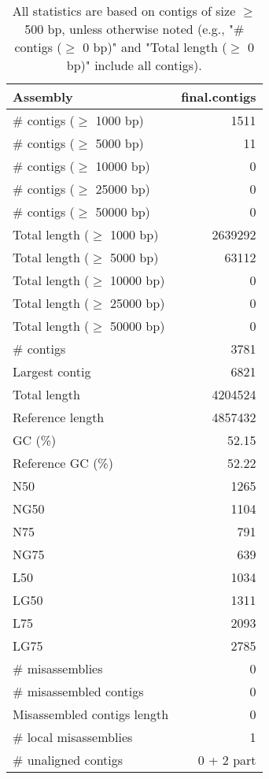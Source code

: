 \documentclass[12pt,a4paper]{article}
\begin{document}
\begin{table}[ht]
\begin{center}
\caption{All statistics are based on contigs of size $\geq$ 500 bp, unless otherwise noted (e.g., "\# contigs ($\geq$ 0 bp)" and "Total length ($\geq$ 0 bp)" include all contigs).}
\begin{tabular}{|l*{1}{|r}|}
\hline
Assembly & final.contigs \\ \hline
\# contigs ($\geq$ 1000 bp) & 1511 \\ \hline
\# contigs ($\geq$ 5000 bp) & 11 \\ \hline
\# contigs ($\geq$ 10000 bp) & 0 \\ \hline
\# contigs ($\geq$ 25000 bp) & 0 \\ \hline
\# contigs ($\geq$ 50000 bp) & 0 \\ \hline
Total length ($\geq$ 1000 bp) & 2639292 \\ \hline
Total length ($\geq$ 5000 bp) & 63112 \\ \hline
Total length ($\geq$ 10000 bp) & 0 \\ \hline
Total length ($\geq$ 25000 bp) & 0 \\ \hline
Total length ($\geq$ 50000 bp) & 0 \\ \hline
\# contigs & 3781 \\ \hline
Largest contig & 6821 \\ \hline
Total length & 4204524 \\ \hline
Reference length & 4857432 \\ \hline
GC (\%) & 52.15 \\ \hline
Reference GC (\%) & 52.22 \\ \hline
N50 & 1265 \\ \hline
NG50 & 1104 \\ \hline
N75 & 791 \\ \hline
NG75 & 639 \\ \hline
L50 & 1034 \\ \hline
LG50 & 1311 \\ \hline
L75 & 2093 \\ \hline
LG75 & 2785 \\ \hline
\# misassemblies & 0 \\ \hline
\# misassembled contigs & 0 \\ \hline
Misassembled contigs length & 0 \\ \hline
\# local misassemblies & 1 \\ \hline
\# unaligned contigs & 0 + 2 part \\ \hline

\end{tabular}
\end{center}
\end{table}
\end{document}
